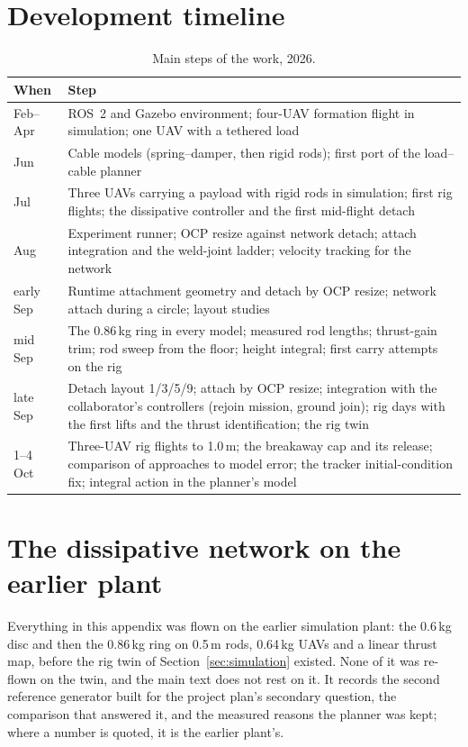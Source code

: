 \section{Development timeline}
\label{sec:app_timeline}

\begin{table}[H]
\centering
\small
\caption{Main steps of the work, 2026.}
\label{tab:app_timeline}
\begin{tabularx}{\textwidth}{lX}
\toprule
When & Step \\
\midrule
Feb--Apr & ROS~2 and Gazebo environment; four-UAV formation flight in simulation; one UAV with a tethered load \\
Jun & Cable models (spring--damper, then rigid rods); first port of the load--cable planner \\
Jul & Three UAVs carrying a payload with rigid rods in simulation; first rig flights; the dissipative controller and the first mid-flight detach \\
Aug & Experiment runner; OCP resize against network detach; attach integration and the weld-joint ladder; velocity tracking for the network \\
early Sep & Runtime attachment geometry and detach by OCP resize; network attach during a circle; layout studies \\
mid Sep & The 0.86\,kg ring in every model; measured rod lengths; thrust-gain trim; rod sweep from the floor; height integral; first carry attempts on the rig \\
late Sep & Detach layout 1/3/5/9; attach by OCP resize; integration with the collaborator's controllers (rejoin mission, ground join); rig days with the first lifts and the thrust identification; the rig twin \\
1--4 Oct & Three-UAV rig flights to 1.0\,m; the breakaway cap and its release; comparison of approaches to model error; the tracker initial-condition fix; integral action in the planner's model \\
\bottomrule
\end{tabularx}
\end{table}

\section{The dissipative network on the earlier plant}
\label{sec:app_network}

Everything in this appendix was flown on the earlier simulation plant: the 0.6\,kg disc and then the 0.86\,kg
ring on 0.5\,m rods, 0.64\,kg UAVs and a linear thrust map, before the rig twin of Section~\ref{sec:simulation}
existed. None of it was re-flown on the twin, and the main text does not rest on it. It records the second
reference generator built for the project plan's secondary question, the comparison that answered it, and the
measured reasons the planner was kept; where a number is quoted, it is the earlier plant's.








